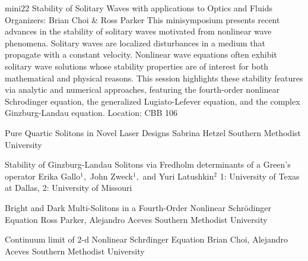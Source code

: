 \mini
{mini22}
{Stability of Solitary Waves with applications to Optics and Fluids}
{Organizers: Brian Choi \& Ross Parker }
{This minisymposium presents recent advances in the stability of solitary waves motivated from nonlinear wave phenomena. Solitary waves are localized disturbances in a medium that propagate with a constant velocity. Nonlinear wave equations often exhibit solitary wave solutions whose stability properties are of interest for both mathematical and physical reasons. This session highlights these stability features via analytic and numerical approaches, featuring the fourth-order nonlinear Schrodinger equation, the generalized Lugiato-Lefever equation, and the complex Ginzburg-Landau equation.}
{Location: CBB 106}

\begin{talks}
\item\talk
{Pure Quartic Solitons in Novel Laser Designs}
{Sabrina Hetzel}
{Southern Methodist University}
\item\talk
{Stability of {G}inzburg-{L}andau Solitons via {F}redholm determinants of a {G}reen's operator}
{Erika Gallo$^{1},$ John Zweck$^{1},$ and Yuri Latushkin$^{2}$}
{1: University of Texas at Dallas, 2: University of Missouri}
\item\talk
{Bright and Dark Multi-Solitons in a Fourth-Order Nonlinear Schr\"odinger Equation}
{Ross Parker, Alejandro Aceves}
{Southern Methodist University}
\item\talk
{Continuum limit of 2-d Nonlinear Schr\"dinger Equation}
{Brian Choi, Alejandro Aceves}
{Southern Methodist University}
\end{talks}
\room
